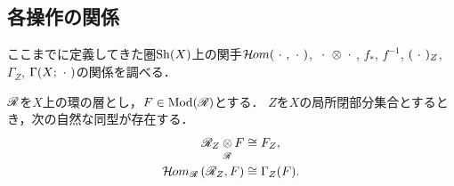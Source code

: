 \subsection*{各操作の関係}

ここまでに定義してきた圏\(\mathrm{Sh}(X)\)上の関手\(\mathop{\mathcal{H}\hspace{-0.5pt}om}\nolimits(\mathord{\ \cdot\ },\mathord{\ \cdot\ })\), 
\(\blk\tens\blk\), \(f_\ast\), \(f^{-1}\), \((\mathord{\ \cdot\ })_Z\), 
\(\Gamma_Z\), \(\Gamma(X;\mathord{\ \cdot\ })\)の関係を調べる．

\begin{leftbar}\begin{PRP}
    \(\mathscr{R}\)を\(X\)上の環の層とし，\(F\in\mathop{\mathrm{Mod}}\nolimits(\mathscr{R})\)とする．
    \(Z\)を\(X\)の局所閉部分集合とするとき，次の自然な同型が存在する．
    \begin{align}
        \scR_{Z}\ttens[\scR]F&\cong F_Z,\label{eq2315}\\
        \HOM_{\scR}\left(\scR_Z,F\right)&\cong\Gamma_Z(F).\label{eq2316}
    \end{align}
\end{PRP}\end{leftbar}
